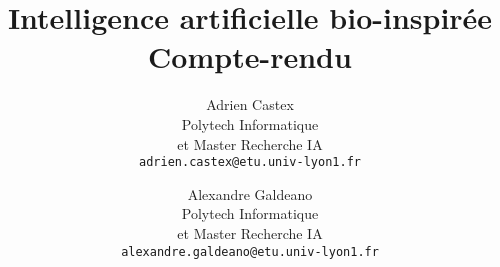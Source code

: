 \documentclass[a4paper,11pt]{article}
\begin{document}
	
\title{Intelligence artificielle bio-inspirée \\ Compte-rendu}
\author{Adrien Castex\\Polytech Informatique\\et Master Recherche IA\\\texttt{\small adrien.castex@etu.univ-lyon1.fr} \and Alexandre Galdeano\\Polytech Informatique\\et Master Recherche IA\\\texttt{\small alexandre.galdeano@etu.univ-lyon1.fr}}
\maketitle

\begin{abstract}

\end{abstract}

\tableofcontents
\thispagestyle{empty}
\clearpage

\setcounter{page}{1}




\newpage
\begingroup
\raggedright
\sloppy


\endgroup
\end{document}
